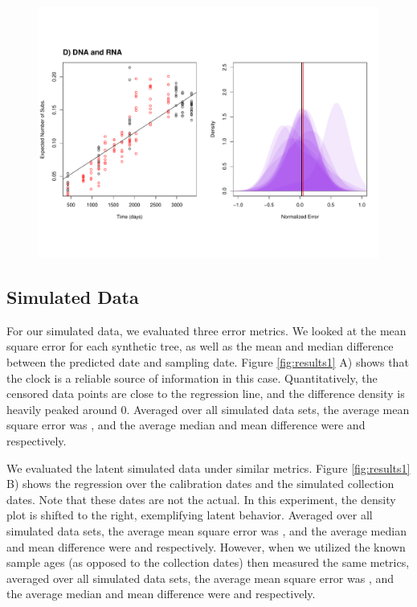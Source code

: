 \begin{figure}[!ht]
	\includegraphics[trim=0cm 4cm 0cm 7cm, clip=true,scale=0.425]{figures/lanl.pdf}
	\caption[Examples]{}
\end{figure}


\subsection{Simulated Data} \label{sec:sim_results}
For our simulated data, we evaluated three error metrics. We looked at the mean square error for each synthetic tree, as well as the mean and median difference between the predicted date and sampling date. Figure \ref{fig:results1} A) shows that the clock is a reliable source of information in this case. Quantitatively, the censored data points are close to the regression line, and the difference density is heavily peaked around 0. Averaged over all simulated data sets, the average mean square error was , and the average median and mean difference were  and  respectively.

We evaluated the latent simulated data under similar metrics. Figure \ref{fig:results1} B) shows the regression over the calibration dates and the simulated collection dates. Note that these dates are not the actual. In this experiment, the density plot is shifted to the right, exemplifying latent behavior. Averaged over all simulated data sets, the average mean square error was , and the average median and mean difference were  and  respectively. However, when we utilized the known sample ages (as opposed to the collection dates) then measured the same metrics, averaged over all simulated data sets, the average mean square error was , and the average median and mean difference were  and  respectively.

